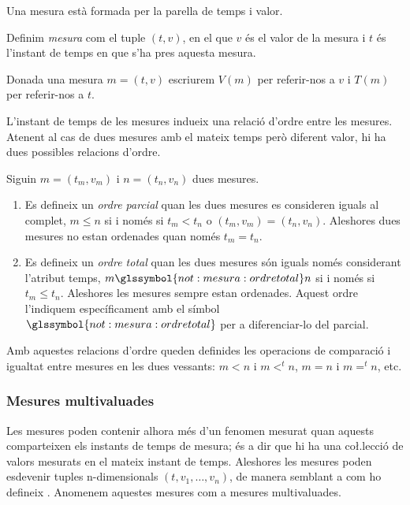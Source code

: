 Una mesura està formada per la parella de temps i valor.

\begin{definition}[Mesura]
  \label{def:model:mesura}
  Definim \emph{mesura} com el tuple $(t,v)$, en el que $v$ és el
  valor de la mesura i $t$ és l'instant de temps en que s'ha pres
  aquesta mesura.
\end{definition}


Donada una mesura $m=(t,v)$ escriurem $V(m)$ per referir-nos a $v$ i
$T(m)$ per referir-nos a $t$.


L'instant de temps de les mesures indueix una relació d'ordre
entre les mesures. Atenent al cas de dues mesures amb el mateix temps
però diferent valor, hi ha dues possibles relacions d'ordre.
\begin{definition}
  \label{def:model:mesura-relacio-ordre}
  Siguin $m=(t_m,v_m)$ i $n=(t_n,v_n)$ dues mesures.

  \begin{enumerate}
  \item Es defineix un \emph{ordre parcial} quan les dues mesures es
    consideren iguals al complet, $m \leq n$ si i només si $t_m < t_n$
    o $(t_m, v_m) = (t_n, v_n)$. Aleshores dues mesures no estan
    ordenades quan només $t_m = t_n$.

  \item Es defineix un \emph{ordre total} quan les dues mesures són
    iguals només considerant l'atribut temps,
    $m\glssymbol{not:mesura:ordretotal} n$ si i només si $t_m\leq
    t_n$. Aleshores les mesures sempre estan ordenades.  Aquest ordre
    l'indiquem específicament amb el símbol
    $\glssymbol{not:mesura:ordretotal}$ per a diferenciar-lo del
    parcial.
  \end{enumerate}
\end{definition}

Amb aquestes relacions d'ordre queden definides les operacions de
comparació i igualtat entre mesures en les dues vessants: $m < n$ i
$m<^t n$, $m=n$ i $m=^t n$, etc.



\subsubsection{Mesures multivaluades}

Les mesures poden contenir alhora més d'un fenomen mesurat quan
aquests comparteixen els instants de temps de mesura; és a dir que hi
ha una co\l.lecció de valors mesurats en el mateix instant de temps.
Aleshores les mesures poden esdevenir tuples n-dimensionals
$(t,v_1,\dotsc,v_n)$, de manera semblant a com ho defineix
\textcite{assfalg08:thesis}.  Anomenem aquestes mesures com a mesures
multivaluades.




